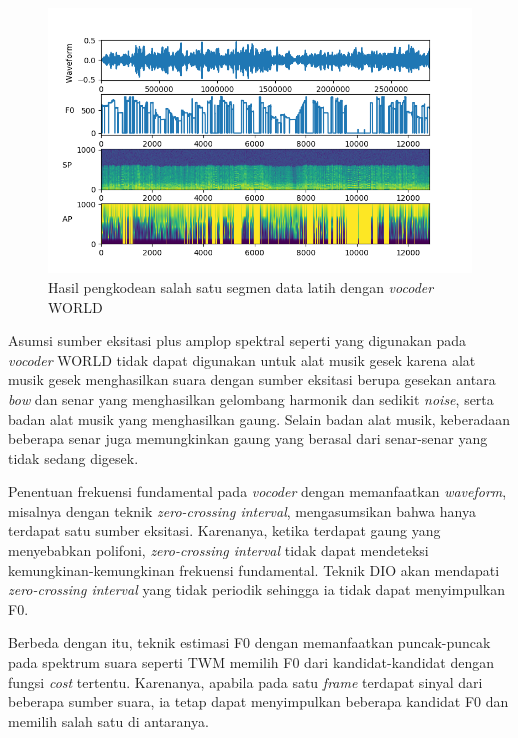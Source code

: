 \begin{figure}[htbp]
    \centering
    \includegraphics[width=\textwidth]{resources/Analisis_vocoder.png}
    \caption{Hasil pengkodean salah satu segmen data latih dengan \textit{vocoder} WORLD} \label{vocoderanalysisresultexample}
\end{figure}

Asumsi sumber eksitasi plus amplop spektral seperti yang digunakan pada \textit{vocoder} WORLD tidak dapat digunakan untuk alat musik gesek karena alat musik gesek menghasilkan suara dengan sumber eksitasi berupa gesekan antara \textit{bow} dan senar yang menghasilkan gelombang harmonik dan sedikit \textit{noise}, serta badan alat musik yang menghasilkan gaung. Selain badan alat musik, keberadaan beberapa senar juga memungkinkan gaung yang berasal dari senar-senar yang tidak sedang digesek.

Penentuan frekuensi fundamental pada \textit{vocoder} dengan memanfaatkan \textit{waveform}, misalnya dengan teknik \textit{zero-crossing interval}, mengasumsikan bahwa hanya terdapat satu sumber eksitasi. Karenanya, ketika terdapat gaung yang menyebabkan polifoni, \textit{zero-crossing interval} tidak dapat mendeteksi kemungkinan-kemungkinan frekuensi fundamental. Teknik DIO akan mendapati \textit{zero-crossing interval} yang tidak periodik sehingga ia tidak dapat menyimpulkan F0.

Berbeda dengan itu, teknik estimasi F0 dengan memanfaatkan puncak-puncak pada spektrum suara seperti TWM memilih F0 dari kandidat-kandidat dengan fungsi \textit{cost} tertentu. Karenanya, apabila pada satu \textit{frame} terdapat sinyal dari beberapa sumber suara, ia tetap dapat menyimpulkan beberapa kandidat F0 dan memilih salah satu di antaranya.

